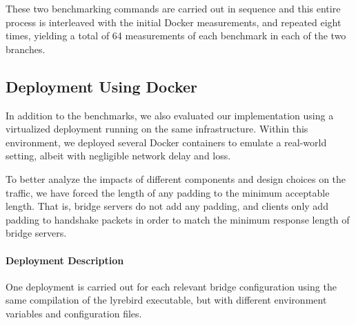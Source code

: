 These two benchmarking commands are carried out in sequence and this entire process is interleaved with the initial Docker measurements, and repeated eight times, yielding a total of 64 measurements of each benchmark in each of the two branches.

\subsection{Deployment Using Docker}

In addition to the benchmarks, we also evaluated our implementation using a virtualized deployment running on the same infrastructure. Within this environment, we deployed several Docker containers to emulate a real-world setting, albeit with negligible network delay and loss.

To better analyze the impacts of different components and design choices on the traffic, we have forced the length of any padding to the minimum acceptable length. That is, bridge servers do not add any padding, and clients only add padding to handshake packets in order to match the minimum response length of bridge servers.

\paragraph{Deployment Description}
One deployment is carried out for each relevant bridge configuration using the same compilation of the lyrebird executable, but with different environment variables and configuration files.


